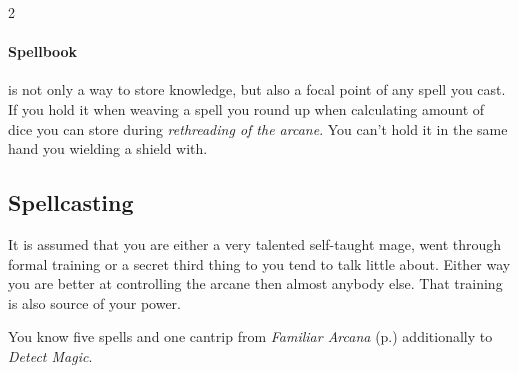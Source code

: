 \begin{multicols*}{2}
\paragraph{Spellbook} is not only a way to store knowledge, but also a focal point of any spell you cast. If you hold it when weaving a spell you round up when calculating amount of dice you can store during \emph{rethreading of the arcane}. You can't hold it in the same hand you wielding a shield with.

\subsection*{Spellcasting}

It is assumed that you are either a very talented self-taught mage, went through formal training or a secret third thing to you tend to talk little about. 
Either way you are better at controlling the arcane then almost anybody else. 
That training is also source of your power.


You know five spells and one cantrip from \emph{Familiar Arcana} (p.\pageref*{sec:spellweaving}) additionally to \emph{Detect Magic}.

\end{multicols*}
